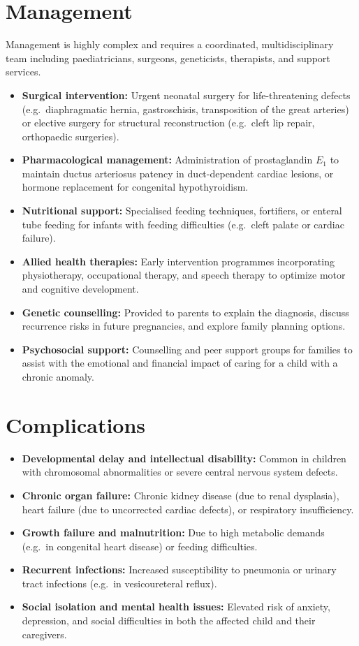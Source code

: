 \section*{Management}
Management is highly complex and requires a coordinated, multidisciplinary team including paediatricians, surgeons, geneticists, therapists, and support services.
\begin{itemize}
    \item \textbf{Surgical intervention:} Urgent neonatal surgery for life-threatening defects (e.g.\ diaphragmatic hernia, gastroschisis, transposition of the great arteries) or elective surgery for structural reconstruction (e.g.\ cleft lip repair, orthopaedic surgeries).
    \item \textbf{Pharmacological management:} Administration of prostaglandin $E_{1}$ to maintain ductus arteriosus patency in duct-dependent cardiac lesions, or hormone replacement for congenital hypothyroidism.
    \item \textbf{Nutritional support:} Specialised feeding techniques, fortifiers, or enteral tube feeding for infants with feeding difficulties (e.g.\ cleft palate or cardiac failure).
    \item \textbf{Allied health therapies:} Early intervention programmes incorporating physiotherapy, occupational therapy, and speech therapy to optimize motor and cognitive development.
    \item \textbf{Genetic counselling:} Provided to parents to explain the diagnosis, discuss recurrence risks in future pregnancies, and explore family planning options.
    \item \textbf{Psychosocial support:} Counselling and peer support groups for families to assist with the emotional and financial impact of caring for a child with a chronic anomaly.
\end{itemize}

\section*{Complications}
\begin{itemize}
    \item \textbf{Developmental delay and intellectual disability:} Common in children with chromosomal abnormalities or severe central nervous system defects.
    \item \textbf{Chronic organ failure:} Chronic kidney disease (due to renal dysplasia), heart failure (due to uncorrected cardiac defects), or respiratory insufficiency.
    \item \textbf{Growth failure and malnutrition:} Due to high metabolic demands (e.g.\ in congenital heart disease) or feeding difficulties.
    \item \textbf{Recurrent infections:} Increased susceptibility to pneumonia or urinary tract infections (e.g.\ in vesicoureteral reflux).
    \item \textbf{Social isolation and mental health issues:} Elevated risk of anxiety, depression, and social difficulties in both the affected child and their caregivers.
\end{itemize}

